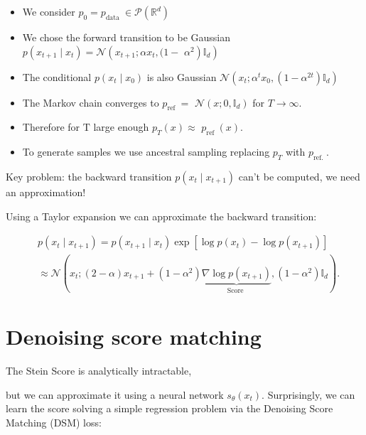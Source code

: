 \documentclass[10pt]{article}
\begin{document}
\begin{itemize}
  \item We consider $p_{0}=p_{\text {data }} \in \mathcal{P}\left(\mathbb{R}^{d}\right)$

  \item We chose the forward transition to be Gaussian $p\left(x_{t+1} \mid x_{t}\right)=\mathcal{N}\left(x_{t+1} ; \alpha x_{t},(1-\right.$ $\left.\left.\alpha^{2}\right) \mathbb{I}_{d}\right)$

  \item The conditional $p\left(x_{t} \mid x_{0}\right)$ is also Gaussian $\mathcal{N}\left(x_{t} ; \alpha^{t} x_{0},\left(1-\alpha^{2 t}\right) \mathbb{I}_{d}\right)$

  \item The Markov chain converges to $p_{\text {ref }}=$ $\mathcal{N}\left(x ; 0, \mathbb{I}_{d}\right)$ for $T \rightarrow \infty$.

  \item Therefore for $\mathrm{T}$ large enough $p_{T}(x) \approx$ $p_{\text {ref }}(x)$.

  \item To generate samples we use ancestral sampling replacing $p_{T}$ with $p_{\text {ref. }}$.

\end{itemize}

Key problem: the backward transition $p\left(x_{t} \mid x_{t+1}\right)$ can't be computed, we need an approximation!

Using a Taylor expansion we can approximate the backward transition:

$$
\begin{aligned}
& p\left(x_{t} \mid x_{t+1}\right)=p\left(x_{t+1} \mid x_{t}\right) \exp \left[\log p\left(x_{t}\right)-\log p\left(x_{t+1}\right)\right] \\
& \approx \mathcal{N}(x_{t} ;(2-\alpha) x_{t+1}+\left(1-\alpha^{2}\right) \underbrace{\nabla \log p\left(x_{t+1}\right)}_{\text {Score }},\left(1-\alpha^{2}\right) \mathbb{I}_{d}) .
\end{aligned}
$$

\section*{Denoising score matching}
The Stein Score is analytically intractable,

but we can approximate it using a neural network $s_{\theta}\left(x_{t}\right)$. Surprisingly, we can learn the score solving a simple regression problem via the Denoising Score Matching (DSM) loss:
\end{document}
